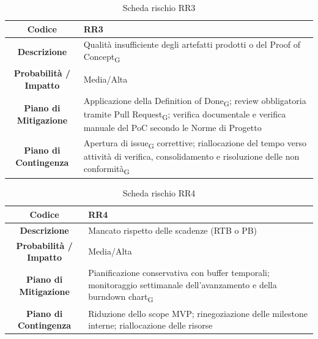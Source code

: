 \begin{table}[H]
	\centering
	\renewcommand{\arraystretch}{1.3}
	\begin{tabularx}{\textwidth}{|c|X|}
		\hline
		\textbf{Codice} & \textbf{RR3} \\
		\hline
		\textbf{Descrizione} & Qualità insufficiente degli artefatti prodotti o del Proof of Concept\textsubscript{G} \\
		\hline
		\textbf{Probabilità / Impatto} & Media/Alta \\
		\hline
		\textbf{Piano di Mitigazione} & Applicazione della Definition of Done\textsubscript{G}; review obbligatoria tramite Pull Request\textsubscript{G}; verifica documentale e verifica manuale del PoC secondo le Norme di Progetto \\
		\hline
		\textbf{Piano di Contingenza} & Apertura di issue\textsubscript{G} correttive; riallocazione del tempo verso attività di verifica, consolidamento e risoluzione delle non conformità\textsubscript{G} \\
		\hline
	\end{tabularx}
	\caption{Scheda rischio RR3}
\end{table}

\begin{table}[H]
	\centering
	\renewcommand{\arraystretch}{1.3}
	\begin{tabularx}{\textwidth}{|c|X|}
		\hline
		\textbf{Codice} & \textbf{RR4} \\
		\hline
		\textbf{Descrizione} & Mancato rispetto delle scadenze (RTB o PB) \\
		\hline
		\textbf{Probabilità / Impatto} & Media/Alta \\
		\hline
		\textbf{Piano di Mitigazione} & Pianificazione conservativa con buffer temporali; monitoraggio settimanale dell'avanzamento e della burndown chart\textsubscript{G} \\
		\hline
		\textbf{Piano di Contingenza} & Riduzione dello scope MVP; rinegoziazione delle milestone interne; riallocazione delle risorse \\
		\hline
	\end{tabularx}
	\caption{Scheda rischio RR4}
\end{table}

